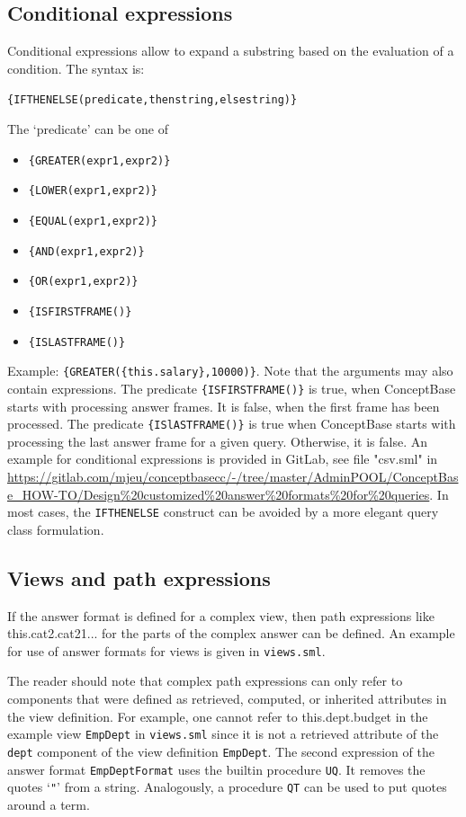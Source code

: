 \subsection{Conditional expressions}

Conditional expressions allow to expand a substring based on the evaluation of a condition. The syntax is:

\verb+{IFTHENELSE(predicate,thenstring,elsestring)}+

The `predicate' can be one of
\begin{itemize}
\item \verb+{GREATER(expr1,expr2)}+
\item \verb+{LOWER(expr1,expr2)}+
\item \verb+{EQUAL(expr1,expr2)}+
\item \verb+{AND(expr1,expr2)}+
\item \verb+{OR(expr1,expr2)}+
\item \verb+{ISFIRSTFRAME()}+
\item \verb+{ISLASTFRAME()}+
\end{itemize}

Example: \verb+{GREATER({this.salary},10000)}+.
Note that the arguments may also contain expressions.
The predicate \verb+{ISFIRSTFRAME()}+ is true, when ConceptBase starts with processing
answer frames. It is false, when the first frame has been processed. The predicate \verb+{ISlASTFRAME()}+
is true when ConceptBase starts with processing the last answer frame for a given query. Otherwise,
it is false.
An example for conditional expressions is provided in GitLab, see
file "csv.sml" in \url{https://gitlab.com/mjeu/conceptbasecc/-/tree/master/AdminPOOL/ConceptBase_HOW-TO/Design%20customized%20answer%20formats%20for%20queries}.
In most cases, the {\tt IFTHENELSE} construct can be avoided by a more elegant query class
formulation.



\subsection{Views and path expressions}

If the answer format is defined for a complex view, then path expressions like {this.cat2.cat21...} for the parts of the complex answer can be
defined.
An example for use of answer formats for views is given in {\tt views.sml}.

The reader should note that complex path expressions can only refer to components that were defined as retrieved, computed, or inherited
attributes in the view definition. For example, one cannot refer to {this.dept.budget} in the example view {\tt EmpDept} in {\tt views.sml}
since it is not a retrieved attribute of the
{\tt dept} component of the view definition {\tt EmpDept}. The second expression of the answer format {\tt EmpDeptFormat}
uses the builtin procedure {\tt UQ}. It removes the quotes `\verb+"+' from a
string. Analogously, a procedure {\tt QT} can be used to put quotes around a term.


